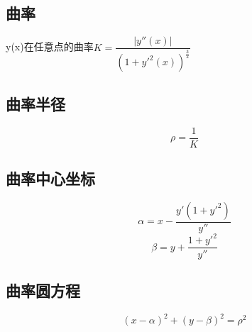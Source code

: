 \subsection{曲率}
y(x)在任意点的曲率\(K = \dfrac{|y''(x)|}{(1 + y'^2(x))^{\frac{3}{2}}}\)

\subsection{曲率半径}
\[\rho = \dfrac{1}{K}\]

\subsection{曲率中心坐标}
\[\alpha = x - \dfrac{y'(1 + y'^2)}{y''}\]
\[\beta = y + \dfrac{1 + y'^2}{y''}\]

\subsection{曲率圆方程}
\[(x - \alpha)^2 + (y - \beta)^2 = \rho^2\]



